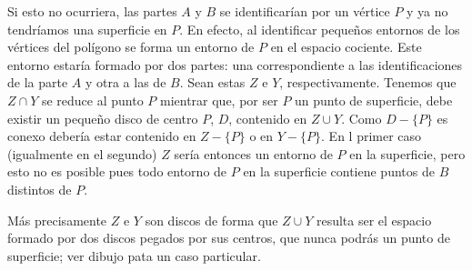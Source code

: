 \documentclass[GTS.tex]{subfiles}
\begin{document}
\begin{dem}
\begin{enumerate}

Si esto no ocurriera, las partes $A$ y $B$ se identificarían por un vértice $P$ y ya no tendríamos una superficie en $P$. En efecto, al identificar pequeños entornos de los vértices del polígono se forma un entorno de $P$ en el espacio cociente. Este entorno estaría formado por dos partes: una  correspondiente a las identificaciones de la parte $A$ y otra a las de $B$. Sean estas $Z$ e $Y$, respectivamente. Tenemos que $Z\cap Y$ se reduce al punto $P$ mientrar que, por ser $P$ un punto de superficie, debe existir un pequeño disco de centro $P$, $D$,  contenido en $Z\cup Y$.  Como $D-\{P\}$ es conexo debería estar contenido en $Z-\{P\}$ o en $Y-\{P\}$. En l primer caso (igualmente en el segundo) $Z$ sería entonces un entorno de $P$ en la superficie, pero esto no es posible pues  todo entorno de $P$  en la superficie contiene puntos de $B$ distintos de $P$. 
\par
Más precisamente $Z$ e $Y$ son discos de forma que $Z\cup Y$ resulta ser el espacio formado por dos discos pegados por sus centros, que nunca podrás un punto de superficie; ver dibujo pata un caso particular. 


\end{enumerate}
\end{dem}
\end{document}
